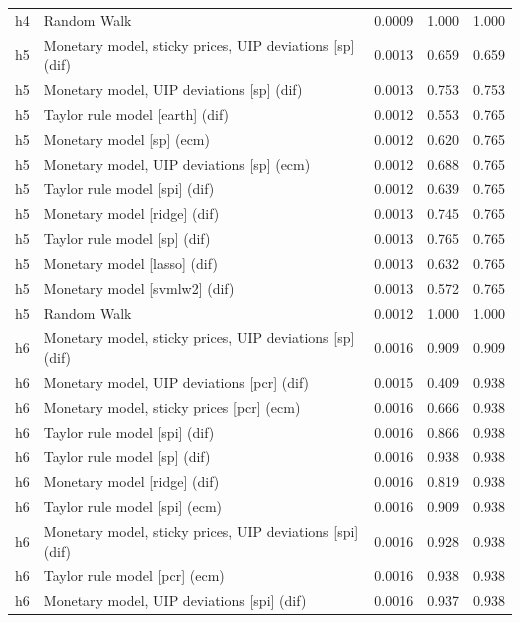 \begin{ThreePartTable}
\begin{longtable}[t]{cp{5.5cm}ccc}
h4 & \raggedright Random Walk & 0.0009 & 1.000 & 1.000\\
\addlinespace
h5 & \raggedright Monetary model, sticky prices, UIP deviations [sp] (dif) & 0.0013 & 0.659 & 0.659\\
h5 & \raggedright Monetary model, UIP deviations [sp] (dif) & 0.0013 & 0.753 & 0.753\\
h5 & \raggedright Taylor rule model [earth] (dif) & 0.0012 & 0.553 & 0.765\\
h5 & \raggedright Monetary model [sp] (ecm) & 0.0012 & 0.620 & 0.765\\
h5 & \raggedright Monetary model, UIP deviations [sp] (ecm) & 0.0012 & 0.688 & 0.765\\
h5 & \raggedright Taylor rule model [spi] (dif) & 0.0012 & 0.639 & 0.765\\
h5 & \raggedright Monetary model [ridge] (dif) & 0.0013 & 0.745 & 0.765\\
h5 & \raggedright Taylor rule model [sp] (dif) & 0.0013 & 0.765 & 0.765\\
h5 & \raggedright Monetary model [lasso] (dif) & 0.0013 & 0.632 & 0.765\\
h5 & \raggedright Monetary model [svmlw2] (dif) & 0.0013 & 0.572 & 0.765\\
h5 & \raggedright Random Walk & 0.0012 & 1.000 & 1.000\\
\addlinespace
h6 & \raggedright Monetary model, sticky prices, UIP deviations [sp] (dif) & 0.0016 & 0.909 & 0.909\\
h6 & \raggedright Monetary model, UIP deviations [pcr] (dif) & 0.0015 & 0.409 & 0.938\\
h6 & \raggedright Monetary model, sticky prices [pcr] (ecm) & 0.0016 & 0.666 & 0.938\\
h6 & \raggedright Taylor rule model [spi] (dif) & 0.0016 & 0.866 & 0.938\\
h6 & \raggedright Taylor rule model [sp] (dif) & 0.0016 & 0.938 & 0.938\\
h6 & \raggedright Monetary model [ridge] (dif) & 0.0016 & 0.819 & 0.938\\
h6 & \raggedright Taylor rule model [spi] (ecm) & 0.0016 & 0.909 & 0.938\\
h6 & \raggedright Monetary model, sticky prices, UIP deviations [spi] (dif) & 0.0016 & 0.928 & 0.938\\
h6 & \raggedright Taylor rule model [pcr] (ecm) & 0.0016 & 0.938 & 0.938\\
h6 & \raggedright Monetary model, UIP deviations [spi] (dif) & 0.0016 & 0.937 & 0.938\\

\end{longtable}
\end{ThreePartTable}
